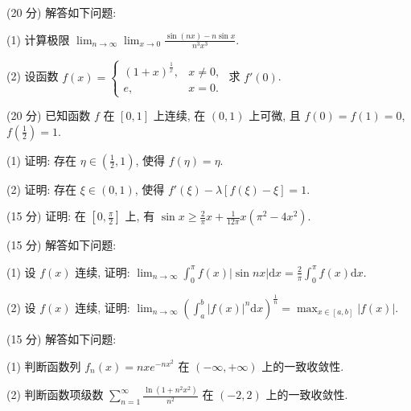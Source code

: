 (20 分) 解答如下问题:\par
(1) 计算极限 $\lim_{n\to \infty}\lim_{x\to 0}\frac{\sin(nx) - n\sin x}{n^3x^3}.$\par
(2) 设函数 $f(x) = \begin{cases} (1 + x)^{\frac{1}{x}}, & x \neq 0, \\ e, & x = 0. \end{cases}$ 求 $f'(0)$.\par
(20 分) 已知函数 $f$ 在 $[0,1]$ 上连续, 在 $(0,1)$ 上可微, 且 $f(0) = f(1) = 0$, $f\left(\frac{1}{2}\right) = 1$.\par
(1) 证明: 存在 $\eta \in \left(\frac{1}{2}, 1\right)$, 使得 $f(\eta) = \eta$.\par
(2) 证明: 存在 $\xi \in (0,1)$, 使得 $f'(\xi) - \lambda[f(\xi) - \xi] = 1$.\par
(15 分) 证明: 在 $\left[0, \frac{\pi}{2}\right]$ 上, 有 $\sin x \geq \frac{2}{\pi} x + \frac{1}{12\pi} x (\pi^2 - 4x^2)$.\par
(15 分) 解答如下问题:\par
(1) 设 $f(x)$ 连续, 证明: $\lim_{n\to \infty}\int_0^\pi f(x)|\sin nx|\mathrm{d}x = \frac{2}{\pi}\int_0^\pi f(x)\mathrm{d}x.$\par
(2) 设 $f(x)$ 连续, 证明: $\lim_{n\to \infty}\left(\int_{a}^{b}|f(x)|^{n}\mathrm{d}x\right)^{\frac{1}{n}} = \max_{x\in [a,b]}|f(x)|.$\par
(15 分) 解答如下问题:\par
(1) 判断函数列 $f_{n}(x) = nxe^{-nx^{2}}$ 在 $(- \infty, +\infty)$ 上的一致收敛性.\par
(2) 判断函数项级数 $\sum_{n=1}^{\infty} \frac{\ln(1 + n^2 x^2)}{n^2}$ 在 $(-2, 2)$ 上的一致收敛性.\par
